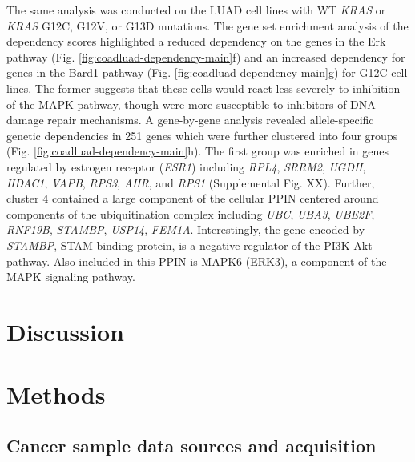 \documentclass[english, 12pt, letterpaper]{article}
\newcommand{\KRAS}{\emph{KRAS}}
\begin{document}
The same analysis was conducted on the LUAD cell lines with WT \KRAS{} or \KRAS{} G12C, G12V, or G13D mutations.
The gene set enrichment analysis of the dependency scores highlighted a reduced dependency on the genes in the Erk pathway (Fig. \ref{fig:coadluad-dependency-main}f) and an increased dependency for genes in the Bard1 pathway (Fig. \ref{fig:coadluad-dependency-main}g) for G12C cell lines.
The former suggests that these cells would react less severely to inhibition of the MAPK pathway, though were more susceptible to inhibitors of DNA-damage repair mechanisms.
A gene-by-gene analysis revealed allele-specific genetic dependencies in 251 genes which were further clustered into four groups (Fig. \ref{fig:coadluad-dependency-main}h).
The first group was enriched in genes regulated by estrogen receptor (\emph{ESR1}) including \emph{RPL4}, \emph{SRRM2}, \emph{UGDH}, \emph{HDAC1}, \emph{VAPB}, \emph{RPS3}, \emph{AHR}, and \emph{RPS1} (Supplemental Fig. XX).
Further, cluster 4 contained a large component of the cellular PPIN centered around components of the ubiquitination complex including \emph{UBC}, \emph{UBA3}, \emph{UBE2F}, \emph{RNF19B}, \emph{STAMBP}, \emph{USP14}, \emph{FEM1A}.
Interestingly, the gene encoded by \emph{STAMBP}, STAM-binding protein, is a negative regulator of the PI3K-Akt pathway.
Also included in this PPIN is MAPK6 (ERK3), a component of the MAPK signaling pathway. 




\section*{Discussion}





\section*{Methods}

\subsection*{Cancer sample data sources and acquisition}
\end{document}
